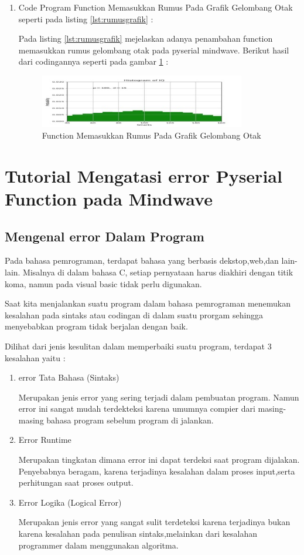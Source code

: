 \begin{enumerate}
\item Code Program Function Memasukkan Rumus Pada Grafik Gelombang Otak seperti pada listing \ref{lst:rumusgrafik} : 

Pada listing \ref{lst:rumusgrafik} mejelaskan adanya penambahan function memasukkan rumus gelombang otak pada pyserial mindwave.
Berikut hasil dari codingannya seperti pada gambar \ref{fig:rumusgrafik} :
\begin{figure}[!htbp]
	\centerline{\includegraphics[width=0.85\textwidth]{figures/4/rumusgrafik.PNG}}
	\caption{Function Memasukkan Rumus Pada Grafik Gelombang Otak}
	\label{fig:rumusgrafik}
\end{figure}
\end{enumerate}

\section{Tutorial Mengatasi error Pyserial Function pada Mindwave}
\subsection{Mengenal error Dalam Program}
Pada bahasa pemrograman, terdapat bahasa yang berbasis dekstop,web,dan lain-lain. Misalnya di dalam bahasa C, setiap pernyataan harus diakhiri dengan titik koma, namun pada visual basic tidak perlu digunakan.

Saat kita menjalankan suatu program dalam  bahasa pemrograman menemukan kesalahan pada sintaks atau codingan di dalam suatu prorgam sehingga menyebabkan program tidak berjalan dengan baik.

Dilihat dari jenis kesulitan dalam memperbaiki suatu program, terdapat 3 kesalahan yaitu :
\begin{enumerate}
\item error Tata Bahasa (Sintaks)

Merupakan jenis error yang sering terjadi dalam pembuatan program. Namun error ini sangat mudah terdekteksi karena umumnya compier dari masing-masing bahasa program sebelum program  di jalankan.

\item Error Runtime

Merupakan tingkatan dimana error ini dapat terdeksi saat program dijalakan. Penyebabnya beragam, karena terjadinya kesalahan dalam proses input,serta perhitungan saat proses output.

\item Error Logika (Logical Error)

Merupakan jenis error yang sangat sulit terdeteksi karena terjadinya bukan karena kesalahan pada penulisan sintaks,melainkan dari kesalahan programmer dalam menggunakan algoritma.
\end{enumerate}

